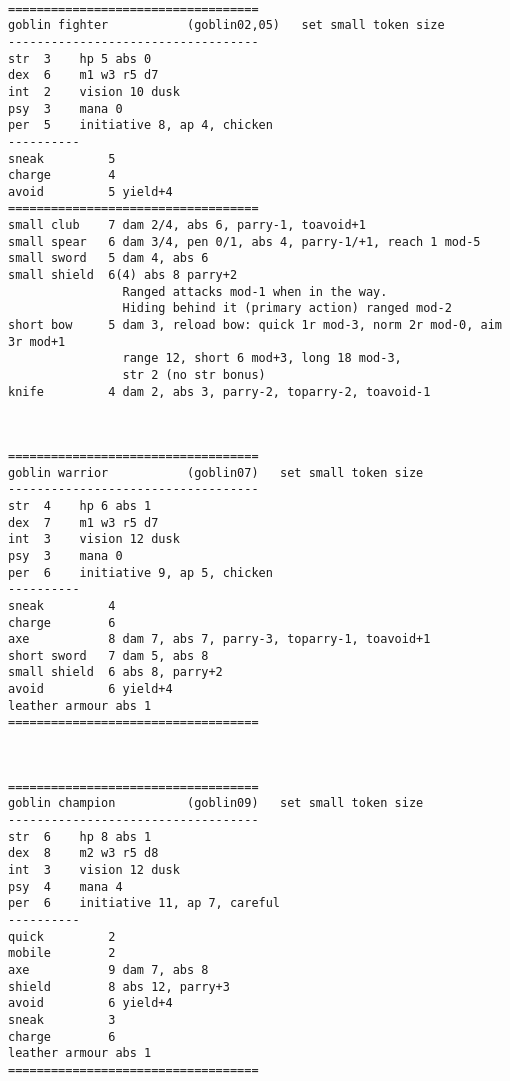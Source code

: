 \

\goodbreak \begin{samepage} \small \begin{verbatim}
===================================
goblin fighter           (goblin02,05)   set small token size
-----------------------------------
str  3    hp 5 abs 0
dex  6    m1 w3 r5 d7
int  2    vision 10 dusk
psy  3    mana 0
per  5    initiative 8, ap 4, chicken
----------
sneak         5
charge        4
avoid         5 yield+4
===================================
small club    7 dam 2/4, abs 6, parry-1, toavoid+1
small spear   6 dam 3/4, pen 0/1, abs 4, parry-1/+1, reach 1 mod-5
small sword   5 dam 4, abs 6
small shield  6(4) abs 8 parry+2
                Ranged attacks mod-1 when in the way.
                Hiding behind it (primary action) ranged mod-2
short bow     5 dam 3, reload bow: quick 1r mod-3, norm 2r mod-0, aim 3r mod+1
                range 12, short 6 mod+3, long 18 mod-3,
                str 2 (no str bonus)
knife         4 dam 2, abs 3, parry-2, toparry-2, toavoid-1
\end{verbatim} \normalsize \end{samepage}

\

\goodbreak \begin{samepage} \small \begin{verbatim}
===================================
goblin warrior           (goblin07)   set small token size
-----------------------------------
str  4    hp 6 abs 1
dex  7    m1 w3 r5 d7
int  3    vision 12 dusk
psy  3    mana 0
per  6    initiative 9, ap 5, chicken
----------
sneak         4
charge        6
axe           8 dam 7, abs 7, parry-3, toparry-1, toavoid+1
short sword   7 dam 5, abs 8
small shield  6 abs 8, parry+2
avoid         6 yield+4
leather armour abs 1
===================================
\end{verbatim} \normalsize \end{samepage}

\

\goodbreak \begin{samepage} \small \begin{verbatim}
===================================
goblin champion          (goblin09)   set small token size
-----------------------------------
str  6    hp 8 abs 1
dex  8    m2 w3 r5 d8
int  3    vision 12 dusk
psy  4    mana 4
per  6    initiative 11, ap 7, careful
----------
quick         2
mobile        2
axe           9 dam 7, abs 8
shield        8 abs 12, parry+3
avoid         6 yield+4
sneak         3
charge        6
leather armour abs 1
===================================
\end{verbatim} \normalsize \end{samepage}

